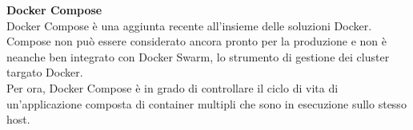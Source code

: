 \textbf{Docker Compose}\\
Docker Compose è una aggiunta recente all’insieme delle soluzioni Docker. Compose non può essere considerato ancora pronto per la produzione e non è neanche ben integrato con Docker Swarm, lo strumento di gestione dei cluster targato Docker.\\
Per ora, Docker Compose è in grado di controllare il ciclo di vita di un’applicazione composta di container multipli che sono in esecuzione sullo stesso host.\\